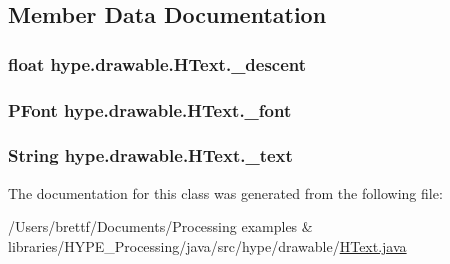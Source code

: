 \subsection{Member Data Documentation}
\hypertarget{classhype_1_1drawable_1_1_h_text_a35e53327d521ba4a19714923ec9b5cd2}{
\subsubsection[{\-\_\-descent}]{\setlength{\rightskip}{0pt plus 5cm}float hype.\-drawable.\-H\-Text.\-\_\-descent\hspace{0.3cm}{\ttfamily [protected]}}}\label{classhype_1_1drawable_1_1_h_text_a35e53327d521ba4a19714923ec9b5cd2}
\hypertarget{classhype_1_1drawable_1_1_h_text_aa55ece9860aeab65ec09852184db221a}{
\subsubsection[{\-\_\-font}]{\setlength{\rightskip}{0pt plus 5cm}P\-Font hype.\-drawable.\-H\-Text.\-\_\-font\hspace{0.3cm}{\ttfamily [protected]}}}\label{classhype_1_1drawable_1_1_h_text_aa55ece9860aeab65ec09852184db221a}
\hypertarget{classhype_1_1drawable_1_1_h_text_a110b21b7f159962f894f70bc46e075c6}{
\subsubsection[{\-\_\-text}]{\setlength{\rightskip}{0pt plus 5cm}String hype.\-drawable.\-H\-Text.\-\_\-text\hspace{0.3cm}{\ttfamily [protected]}}}\label{classhype_1_1drawable_1_1_h_text_a110b21b7f159962f894f70bc46e075c6}


The documentation for this class was generated from the following file\-:\begin{DoxyCompactItemize}
\item 
/\-Users/brettf/\-Documents/\-Processing examples \& libraries/\-H\-Y\-P\-E\-\_\-\-Processing/java/src/hype/drawable/\hyperlink{_h_text_8java}{H\-Text.\-java}\end{DoxyCompactItemize}
